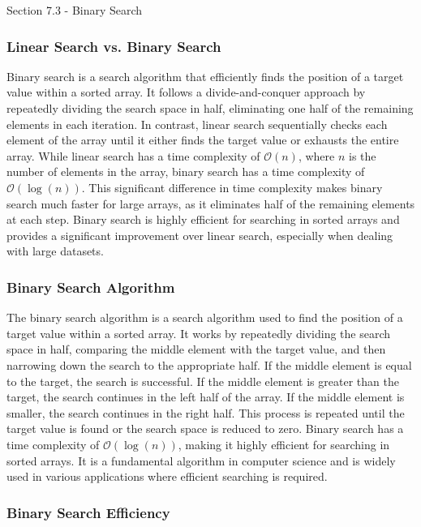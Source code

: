 \begin{notes}{Section 7.3 - Binary Search}
    \subsubsection*{Linear Search vs. Binary Search}

    Binary search is a search algorithm that efficiently finds the position of a target value within a sorted array. It follows a divide-and-conquer approach by repeatedly dividing the search space in half, eliminating one half of the remaining elements in each iteration. In contrast, linear search sequentially checks each element 
    of the array until it either finds the target value or exhausts the entire array. While linear search has a time complexity of $\mathcal{O}(n)$, where $n$ is the number of elements in the array, binary search has a time complexity of $\mathcal{O}(\log{(n)})$. This significant difference in time complexity makes binary search much faster for large arrays, 
    as it eliminates half of the remaining elements at each step. Binary search is highly efficient for searching in sorted arrays and provides a significant improvement over linear search, especially when dealing with large datasets.
    
    \subsubsection*{Binary Search Algorithm}
    
    The binary search algorithm is a search algorithm used to find the position of a target value within a sorted array. It works by repeatedly dividing the search space in half, comparing the middle element with the target value, and then narrowing down the search to the appropriate half. If the middle element is equal to the target, 
    the search is successful. If the middle element is greater than the target, the search continues in the left half of the array. If the middle element is smaller, the search continues in the right half. This process is repeated until the target value is found or the search space is reduced to zero. Binary search has a time complexity 
    of $\mathcal{O}(\log{(n)})$, making it highly efficient for searching in sorted arrays. It is a fundamental algorithm in computer science and is widely used in various applications where efficient searching is required.
    
    \subsubsection*{Binary Search Efficiency}
    

\end{notes}
